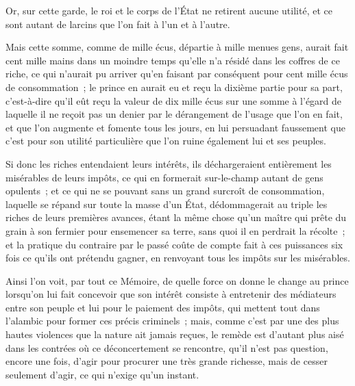 \documentclass[french,twoside]{book} %
\begin{document}
Or, sur cette garde, le roi et le corps de l’État ne retirent aucune utilité, et ce sont autant de larcins que l’on fait à l’un et à l’autre.\par
Mais cette somme, comme de mille écus, départie à mille menues gens, aurait fait cent mille mains dans un moindre temps qu’elle n’a résidé dans les coffres de ce riche, ce qui n’aurait pu arriver qu’en faisant par conséquent pour cent mille écus de consommation ; le prince en aurait eu et reçu la dixième partie pour sa part, c’est-à-dire qu’il eût reçu la valeur de dix mille écus sur une somme à l’égard de laquelle il ne reçoit pas un denier par le dérangement de l’usage que l’on en fait, et que l’on augmente et fomente tous les jours, en lui persuadant faussement que c’est pour son utilité particulière que l’on ruine également lui et ses peuples.\par
Si donc les riches entendaient leurs intérêts, ils déchargeraient entièrement les misérables de leurs impôts, ce qui en formerait sur-le-champ autant de gens opulents ; et ce qui ne se pouvant sans un grand surcroît de consommation, laquelle se répand sur toute la masse d’un État, dédommagerait au triple les riches de leurs premières avances, étant la même chose qu’un maître qui prête du grain à son fermier pour ensemencer sa terre, sans quoi il en perdrait la récolte ; et la pratique du contraire par le passé coûte de compte fait à ces puissances six fois ce qu’ils ont prétendu gagner, en renvoyant tous les impôts sur les misérables.\par
Ainsi l’on voit, par tout ce Mémoire, de quelle force on donne le change au prince lorsqu’on lui fait concevoir que son intérêt consiste à entretenir des médiateurs entre son peuple et lui pour le paiement des impôts, qui mettent tout dans l’alambic pour former ces précis criminels ; mais, comme c’est par une des plus hautes violences que la nature ait jamais reçues, le remède est d’autant plus aisé dans les contrées où ce déconcertement se rencontre, qu’il n’est pas question, encore une fois, d’agir pour procurer une très grande richesse, mais de cesser seulement d’agir, ce qui n’exige qu’un instant.\par
\end{document}
